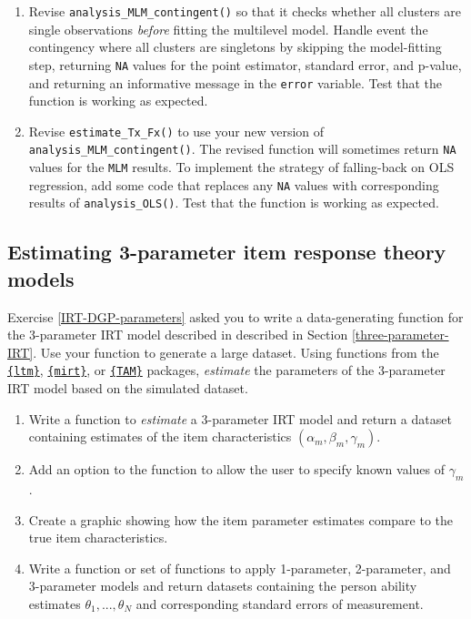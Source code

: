 \documentclass[
]{book}
\begin{document}
\begin{enumerate}
\def\labelenumi{\arabic{enumi}.}
\item
  Revise \texttt{analysis\_MLM\_contingent()} so that it checks whether all clusters are single observations \emph{before} fitting the multilevel model.
  Handle event the contingency where all clusters are singletons by skipping the model-fitting step, returning \texttt{NA} values for the point estimator, standard error, and p-value, and returning an informative message in the \texttt{error} variable. Test that the function is working as expected.
\item
  Revise \texttt{estimate\_Tx\_Fx()} to use your new version of \texttt{analysis\_MLM\_contingent()}. The revised function will sometimes return \texttt{NA} values for the \texttt{MLM} results. To implement the strategy of falling-back on OLS regression, add some code that replaces any \texttt{NA} values with corresponding results of \texttt{analysis\_OLS()}. Test that the function is working as expected.
\end{enumerate}

\subsection{Estimating 3-parameter item response theory models}\label{IRT-3PL-estimation}

Exercise \ref{IRT-DGP-parameters} asked you to write a data-generating function for the 3-parameter IRT model described in described in Section \ref{three-parameter-IRT}.
Use your function to generate a large dataset.
Using functions from the \href{https://cran.r-project.org/package=ltm}{\texttt{\{ltm\}}}, \href{https://cran.r-project.org/package=mirt}{\texttt{\{mirt\}}}, or \href{https://cran.r-project.org/package=TAM}{\texttt{\{TAM\}}} packages, \emph{estimate} the parameters of the 3-parameter IRT model based on the simulated dataset.

\begin{enumerate}
\def\labelenumi{\arabic{enumi}.}
\item
  Write a function to \emph{estimate} a 3-parameter IRT model and return a dataset containing estimates of the item characteristics \((\alpha_m,\beta_m, \gamma_m)\).
\item
  Add an option to the function to allow the user to specify known values of \(\gamma_m\).
\item
  Create a graphic showing how the item parameter estimates compare to the true item characteristics.
\item
  Write a function or set of functions to apply 1-parameter, 2-parameter, and 3-parameter models and return datasets containing the person ability estimates \(\theta_1,...,\theta_N\) and corresponding standard errors of measurement.
\end{enumerate}
\end{document}
